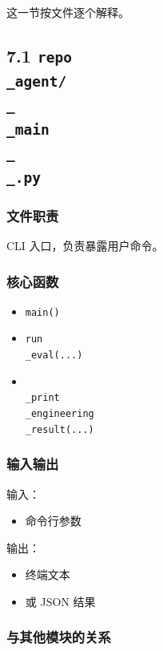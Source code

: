 \documentclass[UTF8,12pt,openany]{ctexbook}
\begin{document}
这一节按文件逐个解释。\par

\subsection{7.1 \texttt{repo\\_agent/\\_\\_main\\_\\_.py}}

\subsubsection{文件职责}

CLI 入口，负责暴露用户命令。\par

\subsubsection{核心函数}

\begin{itemize}
\item \texttt{main()}
\item \texttt{run\\_eval(...)}
\item \texttt{\\_print\\_engineering\\_result(...)}
\end{itemize}

\subsubsection{输入输出}

输入：\par

\begin{itemize}
\item 命令行参数
\end{itemize}

输出：\par

\begin{itemize}
\item 终端文本
\item 或 JSON 结果
\end{itemize}

\subsubsection{与其他模块的关系}
\end{document}
